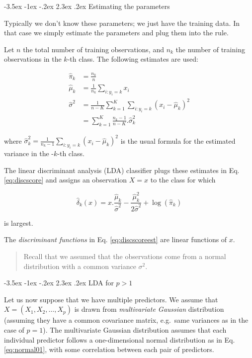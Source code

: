 \documentclass[]{book}
\makeatletter
\renewcommand\section{\@startsection {section}{1}{\z@}%
                                   {-3.5ex \@plus -1ex \@minus -.2ex}%
                                   {2.3ex \@plus.2ex}%
                                   {\normalfont\Large\bfseries\color{ForestGreen}}}
\theoremstyle{definition}
\theoremstyle{definition}
\theoremstyle{definition}
\theoremstyle{remark}
\makeatother
\begin{document}
\section{Estimating the parameters}\label{estimating-the-parameters}

Typically we don't know these parameters; we just have the training
data. In that case we simply estimate the parameters and plug them into
the rule.

Let \(n\) the total number of training observations, and \(n_k\) the
number of training observations in the \(k\)-th class. The following
estimates are used:

\begin{align*}
\hat{\pi}_k &= \frac{n_k}{n} \\
\hat{\mu}_k &= \frac{1}{n_k} \sum_{i: y_i=k} x_i \\
\hat{\sigma}^2 &= \frac{1}{n - K} \sum_{k=1}^K \sum_{i: y_i=k} (x_i-\hat{\mu}_k)^2 \\
 &= \sum_{k=1}^K \frac{n_k-1}{n - K} . \hat{\sigma}_k^2
\end{align*}

where
\(\hat{\sigma}_k^2 = \frac{1}{n_k-1}\sum_{i: y_i=k}(x_i-\hat{\mu}_k)^2\)
is the usual formula for the estimated variance in the -\(k\)-th class.

The linear discriminant analysis (LDA) classifier plugs these estimates
in Eq. \eqref{eq:discscore} and assigns an observation \(X=x\) to the
class for which

\begin{equation}
\hat{\delta}_k(x) = x.\frac{\hat{\mu}_k}{\hat{\sigma}^2} - \frac{\hat{\mu}_k^2}{2\hat{\sigma}^2} + \log (\hat{\pi}_k)
\label{eq:discscoreest}
\end{equation}

is largest.

The \emph{discriminant functions} in Eq. \eqref{eq:discscoreest} are
linear functions of \(x\).

\begin{quote}
Recall that we assumed that the observations come from a normal
distribution with a common variance \(\sigma^2\).
\end{quote}

\section{\texorpdfstring{LDA for
\(p > 1\)}{LDA for p \textgreater{} 1}}\label{lda-for-p-1}

Let us now suppose that we have multiple predictors. We assume that
\(X=(X_1,X_2,\ldots,X_p)\) is drawn from \emph{multivariate Gaussian}
distribution (assuming they have a common covariance matrix, e.g.~same
variances as in the case of \(p=1\)). The multivariate Gaussian
distribution assumes that each individual predictor follows a
one-dimensional normal distribution as in Eq. \eqref{eq:normal01}, with
some correlation between each pair of predictors.
\end{document}
